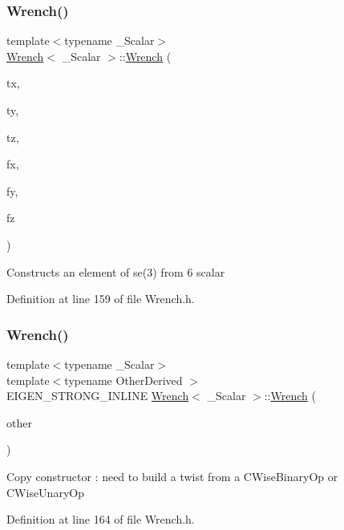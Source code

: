 \subsubsection{\texorpdfstring{Wrench()}{Wrench()}\hspace{0.1cm}{\footnotesize\ttfamily [5/7]}}
{\footnotesize\ttfamily template$<$typename \+\_\+\+Scalar$>$ \\
\hyperlink{class_wrench}{Wrench}$<$ \+\_\+\+Scalar $>$\+::\hyperlink{class_wrench}{Wrench} (\begin{DoxyParamCaption}\item[{Scalar}]{tx,  }\item[{Scalar}]{ty,  }\item[{Scalar}]{tz,  }\item[{Scalar}]{fx,  }\item[{Scalar}]{fy,  }\item[{Scalar}]{fz }\end{DoxyParamCaption})\hspace{0.3cm}{\ttfamily [inline]}}

Constructs an element of se(3) from 6 scalar 

Definition at line 159 of file Wrench.\+h.

\hypertarget{class_wrench_aa3975c26b9d785fc956c86c9bcf82a39}{}\label{class_wrench_aa3975c26b9d785fc956c86c9bcf82a39} 
\subsubsection{\texorpdfstring{Wrench()}{Wrench()}\hspace{0.1cm}{\footnotesize\ttfamily [6/7]}}
{\footnotesize\ttfamily template$<$typename \+\_\+\+Scalar$>$ \\
template$<$typename Other\+Derived $>$ \\
E\+I\+G\+E\+N\+\_\+\+S\+T\+R\+O\+N\+G\+\_\+\+I\+N\+L\+I\+NE \hyperlink{class_wrench}{Wrench}$<$ \+\_\+\+Scalar $>$\+::\hyperlink{class_wrench}{Wrench} (\begin{DoxyParamCaption}\item[{const Matrix\+Base$<$ Other\+Derived $>$ \&}]{other }\end{DoxyParamCaption})\hspace{0.3cm}{\ttfamily [inline]}}

Copy constructor \+: need to build a twist from a C\+Wise\+Binary\+Op or C\+Wise\+Unary\+Op 

Definition at line 164 of file Wrench.\+h.

